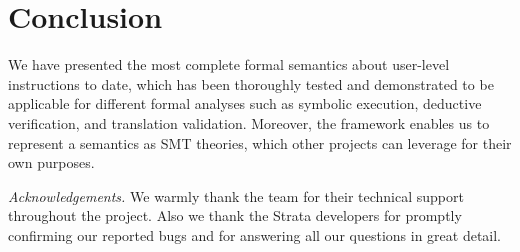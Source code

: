 \section{Conclusion}\label{sec:conc}

We have presented the most complete formal semantics about \ISA user-level instructions
to date, which has been thoroughly tested and demonstrated  to be applicable
for different formal analyses such as symbolic execution, deductive
verification, and translation validation.
Moreover, the \K framework enables us to represent a semantics as SMT theories,
which other projects can
leverage for their own purposes.


\textit{Acknowledgements.}
We warmly thank the \K team
   for their technical support throughout the project.  Also we thank the Strata
   developers for promptly confirming
   our reported bugs and for answering all our questions in great detail.
   

